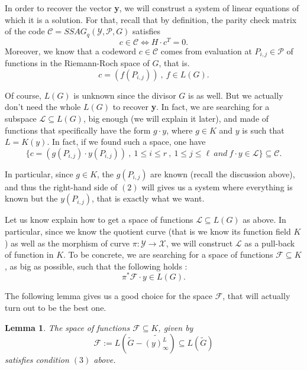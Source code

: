 \documentclass[10pt]{article}
\newtheorem{lem1}{Lemma}[]
\newcommand{\s}{\vspace{0.3cm}}
\newcommand{\cd}{\cdot}
\newcommand{\su}{\subseteq}
\newcommand{\X}{\mathcal{X}}
\newcommand{\Y}{\mathcal{Y}}
\newcommand{\PR}{\mathcal{P}}
\begin{document}
\s

In order to recover the vector \textbf{y}, we will construst a system of linear equations of which it is a solution. For that, recall that by definition, the parity check matrix of the code $\mathcal{C}=SSAG_q(\Y,\PR,G)$ satisfies
\begin{equation}
c \in \mathcal{C} \iff H \cd c^T = 0.
\end{equation}
Moreover, we know that a codeword $c \in \mathcal{C}$ comes from evaluation at $P_{i,j} \in \PR$ of functions in the Riemann-Roch space of $G$, that is.
\[c = (f(P_{i,j})) \ , \ f \in L(G).\]

Of course, $L(G)$ is unknown since the divisor $G$ is as well. But we actually don't need the whole $L(G)$ to recover \textbf{y}. In fact, we are searching for a subspace $\mathcal{L} \su L(G)$, big enough (we will explain it later), and made of functions that specifically have the form $g \cd y$, where $g \in K$ and $y$ is such that $L=K(y)$. In fact, if we found such a space, one have 
\[\{c= (g(P_{i,j}) \cd y(P_{i,j})) \ , \ 1 \leq i \leq r \ , \ 1 \leq j \leq \ell \ and \ f\cd y \in \mathcal{L}\} \su \mathcal{C}.\] 

In particular, since $g \in K$, the $g(P_{i,j})$ are known (recall the discussion above), and thus the right-hand side of $(2)$ will gives us a system where everything is known but the $y(P_{i,j})$, that is exactly what we want.

\s

Let us know explain how to get a space of functions $\mathcal{L} \su L(G)$ as above. In particular, since we know the quotient curve (that is we know its function field $K$) as well as the morphism of curve $\pi : \Y \rightarrow \X$, we will construct $\mathcal{L}$ as a pull-back of function in $K$. To be concrete, we are searching for a space of functions $\mathcal{F} \su K$, as big as possible, such that the following holds :
\begin{equation}
\pi^*\mathcal{F} \cd y \in L(G). 
\end{equation}

The following lemma gives us a good choice for the space $\mathcal{F}$, that will actually turn out to be the best one.

\s

\begin{lem1} \label{constructionD}
The space of functions $\mathcal{F} \su K$, given by 
\[\mathcal{F} := L\left(\widetilde{G}-\widetilde{(y)^L_{\infty}}\right) \su L(\tilde{G})\]
satisfies condition $(3)$ above.
\end{lem1}
\end{document}
